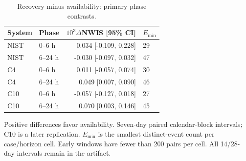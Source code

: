 \begin{table}[t]
\centering\footnotesize
\caption{Recovery minus availability: primary phase contrasts.}
\label{tab:primary}
\setlength{\tabcolsep}{4pt}
\begin{tabular}{llrl}
\hline
System & Phase & $10^3\Delta$NWIS [95\% CI] & $E_{\min}$ \\
\hline
NIST & 0--6 h & 0.034 [-0.109, 0.228] & 29 \\
NIST & 6--24 h & -0.030 [-0.097, 0.032] & 47 \\
C4 & 0--6 h & 0.011 [-0.057, 0.074] & 30 \\
C4 & 6--24 h & 0.049 [0.007, 0.090] & 46 \\
C10 & 0--6 h & -0.057 [-0.127, 0.018] & 27 \\
C10 & 6--24 h & 0.070 [0.003, 0.146] & 45 \\
\hline
\end{tabular}
\par\smallskip
\begin{minipage}{\columnwidth}\scriptsize
Positive differences favor availability. Seven-day paired calendar-block intervals; C10 is a later replication. $E_{\min}$ is the smallest distinct-event count per case/horizon cell. Early windows have fewer than 200 pairs per cell. All 14/28-day intervals remain in the artifact.
\end{minipage}
\end{table}
